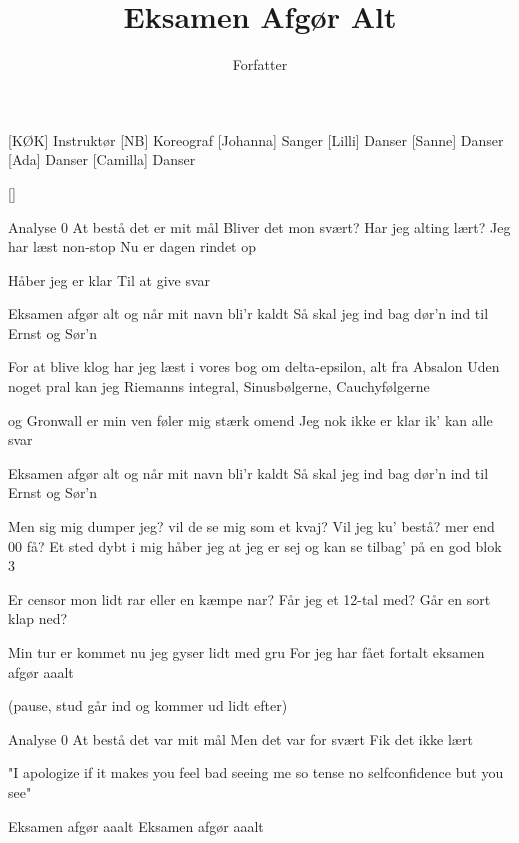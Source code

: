 \documentclass[a4paper,11pt]{article}
\title{Eksamen Afgør Alt}
\author{Forfatter}
\begin{document}
\maketitle

\begin{roles}
[KØK] Instruktør
[NB] Koreograf
[Johanna] Sanger
[Lilli] Danser
[Sanne] Danser
[Ada] Danser
[Camilla] Danser
\end{roles}

\begin{props}
[]
\end{props}

\begin{song}
 Analyse 0
At bestå det er mit mål
Bliver det mon svært?
Har jeg alting lært?
Jeg har læst non-stop
Nu er dagen rindet op

Håber jeg er klar
Til at give svar

Eksamen afgør alt
og når mit navn bli'r kaldt
Så skal jeg ind bag dør'n
ind til Ernst og Sør'n

For at blive klog
har jeg læst i vores bog
om delta-epsilon,
alt fra Absalon
Uden noget pral
kan jeg Riemanns integral,
Sinusbølgerne,
Cauchyfølgerne

og Gronwall er min ven
føler mig stærk omend
Jeg nok ikke er klar
ik' kan alle svar

Eksamen afgør alt
og når mit navn bli'r kaldt
Så skal jeg ind bag dør'n
ind til Ernst og Sør'n

Men sig mig dumper jeg?
vil de se mig som et kvaj?
Vil jeg ku' bestå?
mer end 00 få?
Et sted dybt i mig
håber jeg at jeg er sej
og kan se tilbag'
på en god blok 3

Er censor mon lidt rar
eller en kæmpe nar?
Får jeg et 12-tal med?
Går en sort klap ned?

Min tur er kommet nu
jeg gyser lidt med gru
For jeg har fået fortalt
eksamen afgør aaalt

(pause, stud går ind og kommer ud lidt efter)

Analyse 0
At bestå det var mit mål
Men det var for svært
Fik det ikke lært

"I apologize
if it makes you feel bad
seeing me so tense
no selfconfidence
but you see"

Eksamen afgør aaalt
Eksamen afgør aaalt
\end{song}
\end{document}
